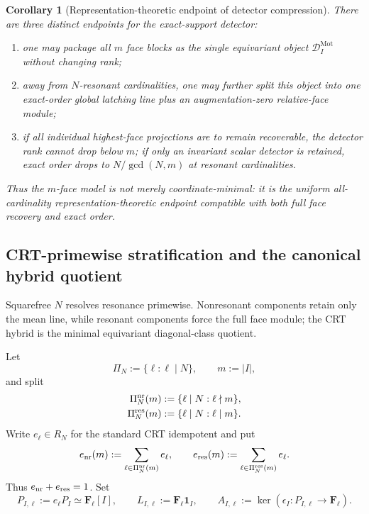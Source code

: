 \documentclass[11pt]{article}
\newtheorem{corollary}[theorem]{Corollary}
\theoremstyle{remark}
\newcommand{\Mot}{\mathrm{Mot}}
\begin{document}
\begin{corollary}[Representation-theoretic endpoint of detector compression]
\label{P2M-cor:representation-compression-endpoint}
There are three distinct endpoints for the exact-support detector:
\begin{enumerate}[label=\textup{(\roman*)}]
\item one may package all $m$ face blocks as the single equivariant object
      $\mathcal D_I^{\Mot}$ without changing rank;
\item away from $N$-resonant cardinalities, one may further split this object
      into one exact-order global latching line plus an augmentation-zero
      relative-face module;
\item if all individual highest-face projections are to remain recoverable,
      the detector rank cannot drop below $m$; if only an invariant scalar
      detector is retained, exact order drops to $N/\gcd(N,m)$ at resonant
      cardinalities.
\end{enumerate}
Thus the $m$-face model is not merely coordinate-minimal: it is the uniform
all-cardinality representation-theoretic endpoint compatible with both full
face recovery and exact order.
\end{corollary}


\subsection{CRT-primewise stratification and the canonical hybrid quotient}

Squarefree \(N\) resolves resonance primewise.  Nonresonant components
retain only the mean line, while resonant components force the full face
module; the CRT hybrid is the minimal equivariant diagonal-class quotient.

Let
\[
 \Pi_N:=\{\ell:\ell\mid N\},\qquad m:=|I|,
\]
and split
\begin{align}
 \Pi_N^{\rm nr}(m)&:=\{\ell\mid N:\ell\nmid m\},\\
 \Pi_N^{\rm res}(m)&:=\{\ell\mid N:\ell\mid m\}.
\end{align}
Write \(e_\ell\in R_N\) for the standard CRT idempotent and put
\begin{equation}
 e_{\rm nr}(m):=\sum_{\ell\in\Pi_N^{\rm nr}(m)}e_\ell,
 \qquad
 e_{\rm res}(m):=\sum_{\ell\in\Pi_N^{\rm res}(m)}e_\ell.
\end{equation}
Thus \(e_{\rm nr}+e_{\rm res}=1\).  Set
\[
 P_{I,\ell}:=e_\ell P_I\simeq\mathbf F_\ell[I],
 \qquad
 L_{I,\ell}:=\mathbf F_\ell\mathbf1_I,
 \qquad
 A_{I,\ell}:=\ker(\epsilon_I:P_{I,\ell}\to\mathbf F_\ell).
\]
\end{document}

